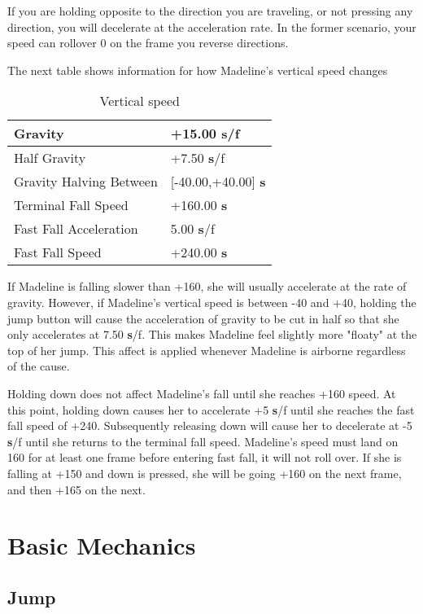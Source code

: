 \documentclass[oneside]{book}
\newcommand{\s}{\textbf{s}}
\begin{document}
If you are holding opposite to the direction you are traveling, or not pressing any direction, you will decelerate at the acceleration rate. In the former scenario, your speed can rollover 0 on the frame you reverse directions.

The next table shows information for how Madeline's vertical speed changes

\begin{table}[h]
\begin{tabular}{|l|l|}
\hline
Gravity&+15.00 \s/f\\
\hline
Half Gravity&+7.50 \s/f\\
\hline
Gravity Halving Between&[-40.00,+40.00] \s\\
\hline
Terminal Fall Speed&+160.00 \s\\
\hline
Fast Fall Acceleration&5.00 \s/f\\
\hline
Fast Fall Speed&+240.00 \s\\
\hline
\end{tabular}
\caption{Vertical speed}
\end{table}

If Madeline is falling slower than +160, she will usually accelerate at the rate of gravity. However, if Madeline's vertical speed is between -40 and +40, holding the jump button will cause the acceleration of gravity to be cut in half so that she only accelerates at 7.50 \s/f. This makes Madeline feel slightly more "floaty" at the top of her jump. This affect is applied whenever Madeline is airborne regardless of the cause.

Holding down does not affect Madeline's fall until she reaches +160 speed. At this point, holding down causes her to accelerate +5 \s/f until she reaches the fast fall speed of +240. Subsequently releasing down will cause her to decelerate at -5 \s/f until she returns to the terminal fall speed. Madeline's speed must land on 160 for at least one frame before entering fast fall, it will not roll over. If she is falling at +150 and down is pressed, she will be going +160 on the next frame, and then +165 on the next.

\chapter{Basic Mechanics}

\section{Jump}
\end{document}
